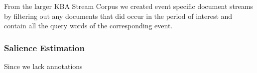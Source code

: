 From the larger KBA Stream Corpus we created event specific document 
streams by filtering out any documents that did occur in the period
of interest and contain all the query words of the corresponding event.  



\subsubsection{Salience Estimation}

Since we lack annotations 

























